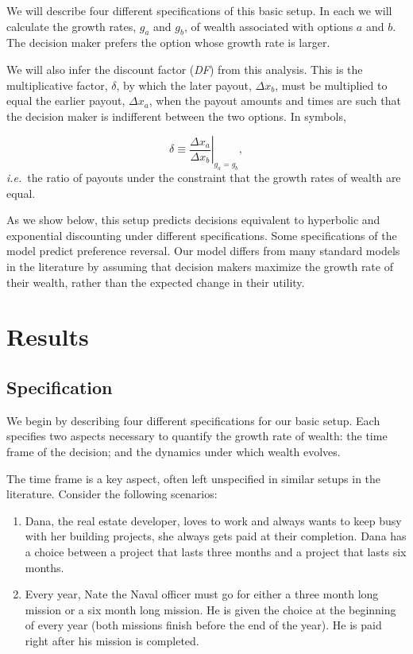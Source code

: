 \documentclass[11pt]{article}
\newcommand{\Sref}[1]{Section~\ref{sec:#1}}
\newcommand{\ie}{{\it i.e.}\ }
\newcommand{\be}{\begin{equation}}
\newcommand{\ee}{\end{equation}}
\newcommand{\Dx}{\Delta x}
\numberwithin{equation}{section}
\begin{document}
We will describe four different specifications of this basic setup. In each we will calculate the growth rates, $g_a$ and $g_b$, of wealth associated with options $a$ and $b$. The decision maker prefers the option whose growth rate is larger.

We will also infer the discount factor (\textit{DF}) from this analysis. This is the multiplicative factor, $\delta$, by which the later payout, $\Dx_b$, must be multiplied to equal the earlier payout, $\Dx_a$, when the payout amounts and times are such that the decision maker is indifferent between the two options. In symbols,

\be
\delta \equiv \left.\frac{\Dx_a}{\Dx_b}\right|_{g_a=g_b},
\ee
\ie the ratio of payouts under the constraint that the growth rates of wealth are equal.

As we show below, this setup predicts decisions equivalent to hyperbolic and exponential discounting under different specifications. Some specifications of the model predict preference reversal. Our model differs from many standard models in the literature by assuming that decision makers maximize the growth rate of their wealth, rather than the expected change in their utility.

\section{Results}\label{sec:results}

\subsection{Specification}

We begin by describing four different specifications for our basic setup. Each specifies two aspects necessary to quantify the growth rate of wealth: the time frame of the decision; and the dynamics under which wealth evolves.

The time frame is a key aspect, often left unspecified in similar setups in the literature. Consider the following scenarios:

\begin{enumerate}
    \item Dana, the real estate developer, loves to work and always wants to keep busy with her building projects, she always gets paid at their completion. Dana has a choice between a project that lasts three months and a project that lasts six months. 
    \item Every year, Nate the Naval officer must go for either a three month long mission or a six month long mission. He is given the choice at the beginning of every year (both missions finish before the end of the year). He is paid right after his mission is completed.
\end{enumerate}
\end{document}
